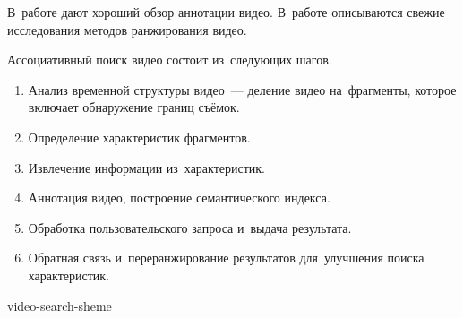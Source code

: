 В~работе \cite{Zhang:2012} дают хороший обзор аннотации видео.
В~работе \cite{XinmieTian:2011} описываются свежие исследования
методов ранжирования видео.

Ассоциативный поиск видео состоит из~следующих шагов.
\begin{enumerate}
    \item Анализ временной структуры видео~—
        деление видео на~фрагменты, которое включает обнаружение границ съёмок.
    \item Определение характеристик фрагментов.
    \item Извлечение информации из~характеристик.
    \item Аннотация видео, построение семантического индекса.
    \item Обработка пользовательского запроса и~выдача результата.
    \item Обратная связь и~переранжирование результатов для~улучшения поиска характеристик.
\end{enumerate}


\begin{figuredt}
    {video-search-sheme}
\end{figuredt}


